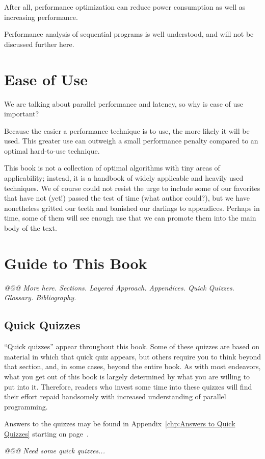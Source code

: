 After all, performance optimization can reduce power consumption as
well as increasing performance.

Performance analysis of sequential programs is well understood,
and will not be discussed further here.




\section{Ease of Use}
\label{sec:intro:Ease of Use}

We are talking about parallel performance and latency,
so why is ease of use important?

Because the easier a performance technique is to use, the more likely
it will be used.
This greater use can outweigh a small performance penalty compared
to an optimal hard-to-use technique.

This book is not a collection of optimal algorithms with tiny areas of
applicability; instead, it is a handbook of widely applicable and heavily
used techniques.
We of course could not resist the urge to include some of our favorites
that have not (yet!) passed the test of time (what author could?), but
we have nonetheless gritted our teeth and banished our darlings to
appendices.
Perhaps in time, some of them will see enough use that we can promote
them into the main body of the text.

\section{Guide to This Book}
\label{sec:intro:Guide to This Book}

\emph{@@@ More here.  Sections.  Layered Approach.  Appendices.
Quick Quizzes.  Glossary.  Bibliography.}

\subsection{Quick Quizzes}

``Quick quizzes'' appear throughout this book.
Some of these quizzes are based on material in which that quick quiz
appears, but others require you to think beyond that section, and,
in some cases, beyond the entire book.
As with most endeavors, what you get out of this book is largely
determined by what you are willing to put into it.
Therefore, readers who invest some time into these quizzes will
find their effort repaid handsomely with increased understanding
of parallel programming.

Answers to the quizzes may be found in
Appendix~\ref{chp:Answers to Quick Quizzes} starting on
page~\pageref{chp:Answers to Quick Quizzes}.

\emph{@@@ Need some quick quizzes...}
